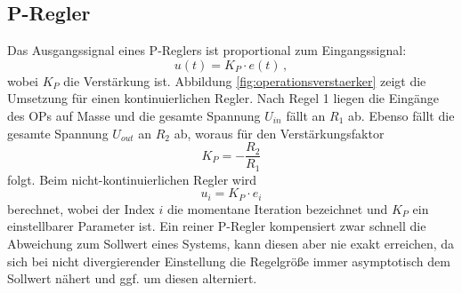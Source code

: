 \subsection{P-Regler}\label{p-regler}
Das Ausgangssignal eines P-Reglers ist proportional zum Eingangssignal:
\begin{equation}\label{eq:p-regler_01}
	u(t)=K_P\cdot e(t)\,,
\end{equation}
wobei $K_P$ die Verstärkung ist. Abbildung
\ref{fig:operationsverstaerker}
zeigt die Umsetzung für einen kontinuierlichen Regler. Nach Regel 1 liegen die Eingänge des OPs auf Masse und die gesamte Spannung $U_{in}$ fällt an $R_1$ ab.
Ebenso fällt die gesamte Spannung $U_{out}$ an $R_2$ ab, woraus für den
Verstärkungsfaktor
\begin{equation}\label{eq:p-regler_02}
	K_P=-\frac{R_2}{R_1}
\end{equation}
folgt. Beim nicht-kontinuierlichen Regler wird
\begin{equation}\label{eq:p-regler_03}
	u_i=K_P\cdot e_i
\end{equation}
berechnet, wobei der Index $i$ die momentane Iteration bezeichnet und $K_P$ ein
einstellbarer Parameter ist. Ein reiner P-Regler kompensiert zwar schnell die
Abweichung zum Sollwert eines Systems, kann diesen aber nie exakt erreichen, da
sich bei nicht divergierender Einstellung die Regelgröße immer asymptotisch
dem Sollwert nähert und ggf. um diesen alterniert.

